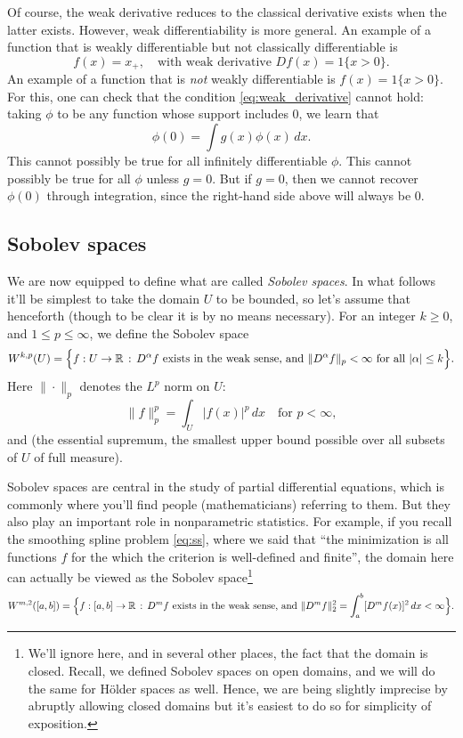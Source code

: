 \documentclass{article}
\DeclareMathOperator*{\esssup}{ess\,sup}
\begin{document}
Of course, the weak derivative reduces to the classical derivative exists when
the latter exists. However, weak differentiability is more general. An example
of a function that is weakly differentiable but not classically differentiable
is
\[
f(x) = x_+, \quad \text{with weak derivative $Df(x) = 1\{x > 0\}$.} 
\]
An example of a function that is \emph{not} weakly differentiable is $f(x) =
1\{x > 0\}$. For this, one can check that the condition
\eqref{eq:weak_derivative} cannot hold: taking $\phi$ to be any function whose
support includes 0, we learn that
\[
\phi(0) = \int g(x) \phi(x) \, dx.
\]
This cannot possibly be true for all infinitely differentiable $\phi$. This
cannot possibly be true for all $\phi$ unless $g=0$. But if $g=0$, then we
cannot recover $\phi(0)$ through integration, since the right-hand side above
will always be 0.   

\subsection{Sobolev spaces}

We are now equipped to define what are called \emph{Sobolev spaces}. In what
follows it'll be simplest to take the domain $U$ to be bounded, so let's 
assume that henceforth (though to be clear it is by no means necessary). For an
integer $k \geq 0$, and $1 \leq p \leq \infty$, we define the Sobolev space    
\[
W^{k,p}(U) = \Big\{ f : U \to \mathbb{R} \,:\, \text{$D^\alpha f$ exists in the weak
  sense, and $\|D^\alpha f\|_p < \infty$ for all $|\alpha| \leq k$} \Big\}. 
\]
Here $\|\cdot\|_p$ denotes the $L^p$ norm on $U$: 
\[
\|f\|_p^p = \int_U |f(x)|^p \, dx \quad \text{for $p < \infty$}, 
\]
and \smash{$\|f\|_\infty = \esssup_{x \in U} \, |f(x)|$} (the essential
supremum, the smallest upper bound possible over all subsets of $U$ of full
measure).

Sobolev spaces are central in the study of partial differential equations, which
is commonly where you'll find people (mathematicians) referring to them. But
they also play an important role in nonparametric statistics. For example, if
you recall the smoothing spline problem \eqref{eq:ss}, where we said that ``the
minimization is all functions $f$ for the which the criterion is well-defined
and finite'', the domain here can actually be viewed as the Sobolev
space\footnote{We'll ignore here, and in several other places, the fact that
  the domain is closed. Recall, we defined Sobolev spaces on open domains, 
  and we will do the same for H{\"o}lder spaces as well. Hence, we are being 
  slightly imprecise by abruptly allowing closed domains but it's easiest to do 
  so for simplicity of exposition.}    
\[
W^{m,2}([a,b]) = \Big\{ f : [a,b] \to \mathbb{R} \,:\, \text{$D^m f$ exists in the weak
  sense, and $\|D^m f\|_2^2 = \int_a^b [D^m f(x)]^2 \, dx < \infty$} \Big\}. 
\]
\end{document}
